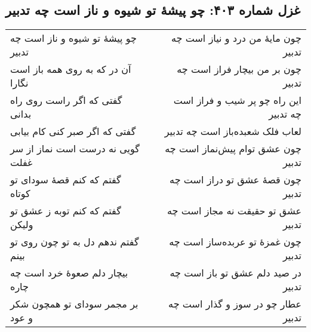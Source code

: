 \begin{center}
\section*{غزل شماره ۴۰۳: چو پیشهٔ تو شیوه و ناز است چه تدبیر}
\label{sec:403}
\begin{longtable}{l p{0.5cm} r}
چو پیشهٔ تو شیوه و ناز است چه تدبیر
&&
چون مایهٔ من درد و نیاز است چه تدبیر
\\
آن در که به روی همه باز است نگارا
&&
چون بر من بیچار فراز است چه تدبیر
\\
گفتی که اگر راست روی راه بدانی
&&
این راه چو پر شیب و فراز است چه تدبیر
\\
گفتی که اگر صبر کنی کام بیابی
&&
لعاب فلک شعبده‌باز است چه تدبیر
\\
گویی نه درست است نماز از سر غفلت
&&
چون عشق توام پیش‌نماز است چه تدبیر
\\
گفتم که کنم قصهٔ سودای تو کوتاه
&&
چون قصهٔ عشق تو دراز است چه تدبیر
\\
گفتم که کنم توبه ز عشق تو ولیکن
&&
عشق تو حقیقت نه مجاز است چه تدبیر
\\
گفتم ندهم دل به تو چون روی تو بینم
&&
چون غمزهٔ تو عربده‌ساز است چه تدبیر
\\
بیچار دلم صعوهٔ خرد است چه چاره
&&
در صید دلم عشق تو باز است چه تدبیر
\\
بر مجمر سودای تو همچون شکر و عود
&&
عطار چو در سوز و گذار است چه تدبیر
\\
\end{longtable}
\end{center}
